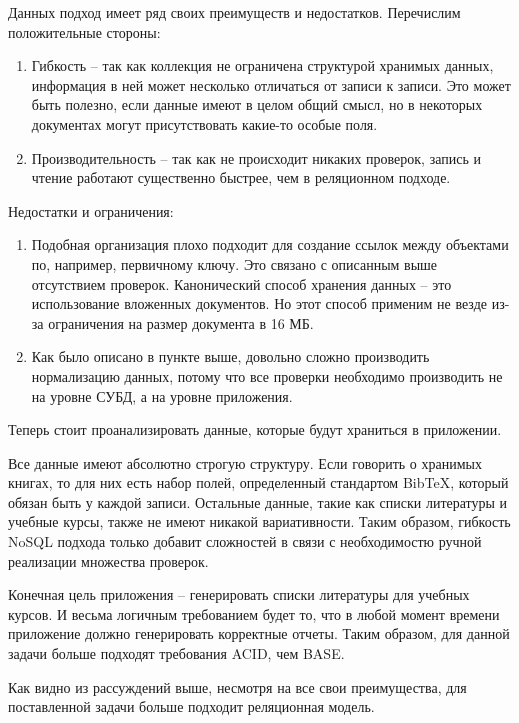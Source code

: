Данных подход имеет ряд своих преимуществ и недостатков. Перечислим положительные стороны:

\begin{enumerate}
	\item Гибкость -- так как коллекция не ограничена структурой хранимых данных, информация
	      в ней может несколько отличаться от записи к записи. Это может быть полезно, если
	      данные имеют в целом общий смысл, но в некоторых документах могут присутствовать
	      какие-то особые поля.
	\item Производительность -- так как не происходит никаких проверок, запись и чтение
	      работают существенно быстрее, чем в реляционном подходе.
\end{enumerate}

Недостатки и ограничения:

\begin{enumerate}
	\item Подобная организация плохо подходит для создание ссылок между объектами по, например,
	      первичному ключу. Это связано с описанным выше отсутствием проверок. Канонический
	      способ хранения данных -- это использование вложенных документов. Но этот способ
	      применим не везде из-за ограничения на размер документа в 16 МБ.
	\item Как было описано в пункте выше, довольно сложно производить нормализацию
	      данных, потому что все проверки необходимо производить не на уровне СУБД, а
	      на уровне приложения.
\end{enumerate}

Теперь стоит проанализировать данные, которые будут храниться в приложении.

Все данные имеют абсолютно строгую структуру. Если говорить о хранимых книгах, то для них есть набор полей, определенный
стандартом BibTeX, который обязан быть у каждой записи. Остальные данные, такие как списки литературы
и учебные курсы, также не имеют никакой вариативности. Таким образом, гибкость NoSQL подхода только 
добавит сложностей в связи с необходимостю ручной реализации множества проверок.

Конечная цель приложения -- генерировать списки литературы
для учебных курсов. И весьма логичным требованием будет то, что в любой момент времени приложение
должно генерировать корректные отчеты. Таким образом, для данной задачи больше подходят требования
ACID, чем BASE.

Как видно из рассуждений выше, несмотря на все свои преимущества, для поставленной задачи больше
подходит реляционная модель.
